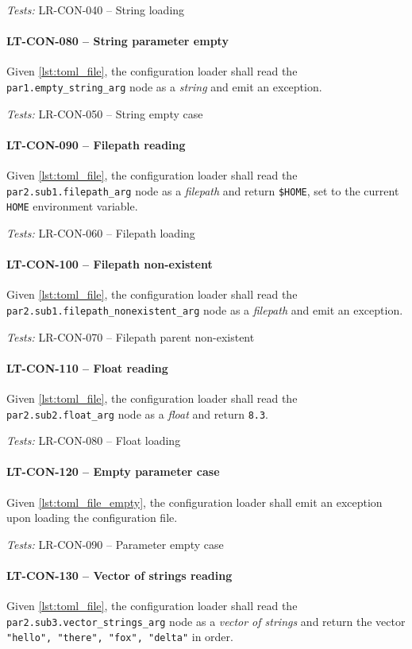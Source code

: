 \textit{Tests: } LR-CON-040 -- String loading

\paragraph{LT-CON-080 -- String parameter empty}
Given \cref{lst:toml_file}, the configuration loader shall read the
\lstinline{par1.empty_string_arg} node as a \emph{string} and emit an exception.

\textit{Tests: } LR-CON-050 -- String empty case

\paragraph{LT-CON-090 -- Filepath reading}
Given \cref{lst:toml_file}, the configuration loader shall read the
\lstinline{par2.sub1.filepath_arg} node as a \emph{filepath}
and return \lstinline{$HOME}, set to the current \lstinline{HOME} environment
variable.

\textit{Tests: } LR-CON-060 -- Filepath loading

\paragraph{LT-CON-100 -- Filepath non-existent}
Given \cref{lst:toml_file}, the configuration loader shall read the
\lstinline{par2.sub1.filepath_nonexistent_arg} node as a \emph{filepath}
and emit an exception.

\textit{Tests: } LR-CON-070 -- Filepath parent non-existent

\paragraph{LT-CON-110 -- Float reading}
Given \cref{lst:toml_file}, the configuration loader shall read the
\lstinline{par2.sub2.float_arg} node as a \emph{float} and return
\lstinline{8.3}.

\textit{Tests: } LR-CON-080 -- Float loading

\paragraph{LT-CON-120 -- Empty parameter case}
Given \cref{lst:toml_file_empty}, the configuration loader shall emit an
exception upon loading the configuration file.

\textit{Tests: } LR-CON-090 -- Parameter empty case

\paragraph{LT-CON-130 -- Vector of strings reading}
Given \cref{lst:toml_file}, the configuration loader shall read the
\lstinline{par2.sub3.vector_strings_arg} node as a \emph{vector of strings}
and return the vector \lstinline{"hello", "there", "fox", "delta"} in order.

